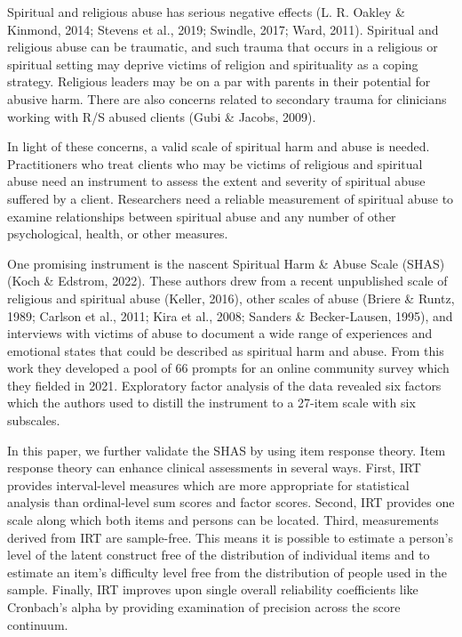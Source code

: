 \documentclass[
  letterpaper,
]{article}
\begin{document}
Spiritual and religious abuse has serious negative effects (L. R. Oakley
\& Kinmond, 2014; Stevens et al., 2019; Swindle, 2017; Ward, 2011).
Spiritual and religious abuse can be traumatic, and such trauma that
occurs in a religious or spiritual setting may deprive victims of
religion and spirituality as a coping strategy. Religious leaders may be
on a par with parents in their potential for abusive harm. There are
also concerns related to secondary trauma for clinicians working with
R/S abused clients (Gubi \& Jacobs, 2009).

In light of these concerns, a valid scale of spiritual harm and abuse is
needed. Practitioners who treat clients who may be victims of religious
and spiritual abuse need an instrument to assess the extent and severity
of spiritual abuse suffered by a client. Researchers need a reliable
measurement of spiritual abuse to examine relationships between
spiritual abuse and any number of other psychological, health, or other
measures.

One promising instrument is the nascent Spiritual Harm \& Abuse Scale
(SHAS) (Koch \& Edstrom, 2022). These authors drew from a recent
unpublished scale of religious and spiritual abuse (Keller, 2016), other
scales of abuse (Briere \& Runtz, 1989; Carlson et al., 2011; Kira et
al., 2008; Sanders \& Becker-Lausen, 1995), and interviews with victims
of abuse to document a wide range of experiences and emotional states
that could be described as spiritual harm and abuse. From this work they
developed a pool of 66 prompts for an online community survey which they
fielded in 2021. Exploratory factor analysis of the data revealed six
factors which the authors used to distill the instrument to a 27-item
scale with six subscales.

In this paper, we further validate the SHAS by using item response
theory. Item response theory can enhance clinical assessments in several
ways. First, IRT provides interval-level measures which are more
appropriate for statistical analysis than ordinal-level sum scores and
factor scores. Second, IRT provides one scale along which both items and
persons can be located. Third, measurements derived from IRT are
sample-free. This means it is possible to estimate a person's level of
the latent construct free of the distribution of individual items and to
estimate an item's difficulty level free from the distribution of people
used in the sample. Finally, IRT improves upon single overall
reliability coefficients like Cronbach's alpha by providing examination
of precision across the score continuum.
\end{document}
